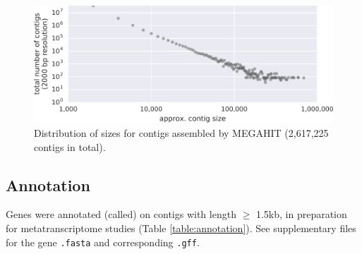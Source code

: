 \begin{figure}[H]
\centering
    \includegraphics[width=1.0\textwidth]{./tex/chapter2/figures/170123_frac_reads_binned_at_different_contig_lengths_and_total--INKSCAPED.pdf}
    \begin{singlespace}
    \caption[Distribution of contig sizes]{
        Distribution of sizes for contigs assembled by MEGAHIT (2,617,225 contigs in total).}
    \label{fig:contig_lengths}
    \end{singlespace}
\end{figure}



\subsection{Annotation}



Genes were annotated (called) on contigs with length $\geq$ 1.5kb, in preparation for metatranscriptome studies (Table \ref{table:annotation}).
See supplementary files for the gene \texttt{.fasta} and corresponding \texttt{.gff}. %

